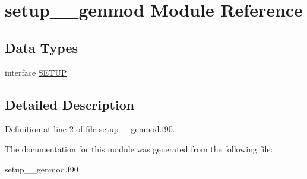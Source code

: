 \hypertarget{classsetup____genmod}{\section{setup\+\_\+\+\_\+genmod Module Reference}
\label{classsetup____genmod}
}
\subsection*{Data Types}
\begin{DoxyCompactItemize}
\item 
interface \hyperlink{interfacesetup____genmod_1_1_s_e_t_u_p}{S\+E\+T\+U\+P}
\end{DoxyCompactItemize}


\subsection{Detailed Description}


Definition at line 2 of file setup\+\_\+\+\_\+genmod.\+f90.



The documentation for this module was generated from the following file\+:\begin{DoxyCompactItemize}
\item 
setup\+\_\+\+\_\+genmod.\+f90\end{DoxyCompactItemize}
